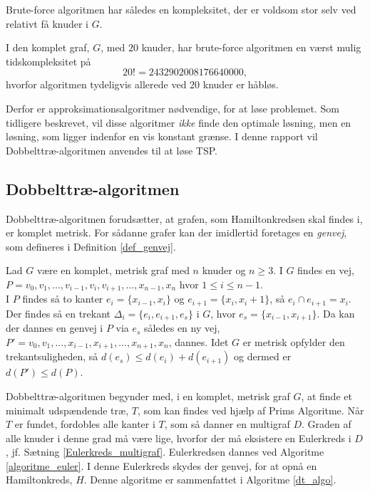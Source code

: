 Brute-force algoritmen har således en kompleksitet, der er voldsom stor selv ved relativt få knuder i $G$.

\begin{exmp}
I den komplet graf, $G$, med $20$ knuder, har brute-force algoritmen en værst mulig tidskompleksitet på $$20! = 2432902008176640000,$$ hvorfor algoritmen tydeligvis allerede ved $20$ knuder er håbløs.
\end{exmp}

Derfor er approksimationsalgoritmer nødvendige, for at løse problemet. Som tidligere beskrevet, vil disse algoritmer \textit{ikke} finde den optimale løsning, men en løsning, som ligger indenfor en vis konstant grænse. I denne rapport vil Dobbelttræ-algoritmen anvendes til at løse TSP. 

\subsection{Dobbelttræ-algoritmen}
Dobbelttræ-algoritmen forudsætter, at grafen, som Hamiltonkredsen skal findes i, er komplet metrisk. For sådanne grafer kan der imidlertid foretages en \textit{genvej}, som defineres i Definition \ref{def_genvej}.

\begin{defn}
Lad $G$ være en komplet, metrisk graf med $n$ knuder og $n \geq 3$. I $G$ findes en vej, $P = v_0, v_1,...,v_{i-1}, v_i, v_{i+1},...,x_{n-1},x_n$ hvor $1 \leq i \leq n-1$. \\
I $P$ findes så to kanter $e_i = \lbrace x_{i-1}, x_i \rbrace$ og $e_{i+1} = \lbrace x_i, x_i+1 \rbrace$, så $e_i \cap e_{i+1} = x_i$.
Der findes så en trekant $\Delta_i = \lbrace e_i, e_{i+1}, e_s \rbrace$ i $G$, hvor $e_s = \lbrace x_{i-1}, x_{i+1} \rbrace$.
Da kan der dannes en genvej i $P$ via $e_s$ således en ny vej, $P'=v_0, v_1,...,x_{i-1},x_{i+1},...,x_{n+1},x_n$, dannes.
Idet $G$ er metrisk opfylder den trekantsuligheden, så $d(e_s) \leq d(e_i) + d(e_{i+1})$ og dermed er $d(P') \leq d(P)$.
\label{def_genvej}
\end{defn}

Dobbelttræ-algoritmen begynder med, i en komplet, metrisk graf $G$, at finde et minimalt udspændende træ, $T$, som kan findes ved hjælp af Prims Algoritme. Når $T$ er fundet, fordobles alle kanter i $T$, som så danner en multigraf $D$. Graden af alle knuder i denne grad må være lige, hvorfor der må eksistere en Eulerkreds i $D$, jf. Sætning \ref{Eulerkreds_multigraf}. Eulerkredsen dannes ved Algoritme \ref{algoritme_euler}.  I denne Eulerkreds skydes der genvej, for at opnå en Hamiltonkreds, $H$. Denne algoritme er sammenfattet i Algoritme \ref{dt_algo}. 


